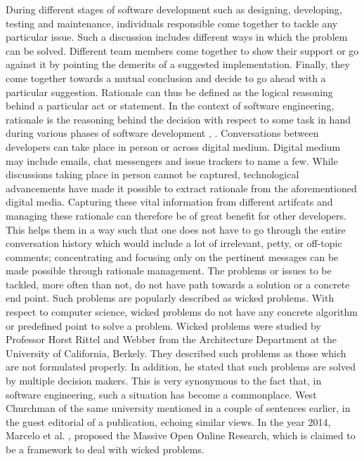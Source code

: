\documentclass[a4paper,12pt,twoside]{report}
\begin{document}
During different stages of software development such as designing, developing, testing and maintenance, individuals responsible come together to tackle any particular issue. Such a discussion includes different ways in which the problem can be solved. Different team members come together to show their support or go against it by pointing the demerits of a suggested implementation. Finally, they come together towards a mutual conclusion and decide to go ahead with a particular suggestion. Rationale can thus be defined as the logical reasoning behind a particular act or statement. In the context of software engineering, rationale is the reasoning behind the decision with respect to some task in hand during various phases of software development \cite{Dutoit2006}, \cite{Bruegge2009}. 
\newline \newline
Conversations between developers can take place in person or across digital medium. Digital medium may include emails, chat messengers and issue trackers to name a few. While discussions taking place in person cannot be captured, technological advancements have made it possible to extract rationale from the aforementioned digital media. Capturing these vital information from different artifcats and managing these rationale can therefore be of great benefit for other developers. This helps them in a way such that one does not have to go through the entire conversation history which would include a lot of irrelevant, petty, or off-topic comments; concentrating and focusing only on the pertinent messages can be made possible through rationale management. 
\newline \newline
The problems or issues to be tackled, more often than not, do not have path towards a solution or a concrete end point. Such problems are popularly described as wicked problems. With respect to computer science, wicked problems do not have any concrete algorithm or predefined point to solve a problem. Wicked problems were studied by Professor Horst Rittel and Webber \cite{Rittel1973} from the Architecture Department at the University of California, Berkely. They described such problems as those which are not formulated properly. In addition, he stated that such problems are solved by multiple decision makers. This is very synonymous to the fact that, in software engineering, such a situation has become a commonplace. West Churchman \cite{InstituteofManagementSciences.1967} of the same university mentioned in a couple of sentences earlier, in the guest editorial of a publication, echoing similar views. In the year 2014, Marcelo et al. \cite{Machado2014}, proposed the Massive Open Online Research, which is claimed to be a framework to deal with wicked problems. 
\end{document}
